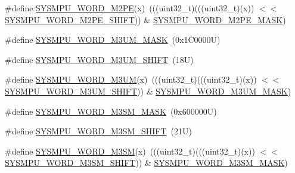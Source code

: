 \begin{DoxyCompactItemize}
\#define \mbox{\hyperlink{group___s_y_s_m_p_u___register___masks_ga04e88db67ef837b1c5916513c6b825cd}{S\+Y\+S\+M\+P\+U\+\_\+\+W\+O\+R\+D\+\_\+\+M2\+PE}}(x)~(((uint32\+\_\+t)(((uint32\+\_\+t)(x)) $<$$<$ \mbox{\hyperlink{group___s_y_s_m_p_u___register___masks_gaa7e65aacdb7fea3b44442a9262ed6232}{S\+Y\+S\+M\+P\+U\+\_\+\+W\+O\+R\+D\+\_\+\+M2\+P\+E\+\_\+\+S\+H\+I\+FT}})) \& \mbox{\hyperlink{group___s_y_s_m_p_u___register___masks_ga7f72b16598726a30a3fcd0f69e5f88f1}{S\+Y\+S\+M\+P\+U\+\_\+\+W\+O\+R\+D\+\_\+\+M2\+P\+E\+\_\+\+M\+A\+SK}})
\item 
\#define \mbox{\hyperlink{group___s_y_s_m_p_u___register___masks_ga9b6b9421f66f545a7ed0c342eb0e5e2e}{S\+Y\+S\+M\+P\+U\+\_\+\+W\+O\+R\+D\+\_\+\+M3\+U\+M\+\_\+\+M\+A\+SK}}~(0x1\+C0000\+U)
\item 
\#define \mbox{\hyperlink{group___s_y_s_m_p_u___register___masks_gadfbd9684345392e532f7fd37bbd5a3f2}{S\+Y\+S\+M\+P\+U\+\_\+\+W\+O\+R\+D\+\_\+\+M3\+U\+M\+\_\+\+S\+H\+I\+FT}}~(18\+U)
\item 
\#define \mbox{\hyperlink{group___s_y_s_m_p_u___register___masks_gab7dcfe7c446a2e44c7e31bed98b34f5f}{S\+Y\+S\+M\+P\+U\+\_\+\+W\+O\+R\+D\+\_\+\+M3\+UM}}(x)~(((uint32\+\_\+t)(((uint32\+\_\+t)(x)) $<$$<$ \mbox{\hyperlink{group___s_y_s_m_p_u___register___masks_gadfbd9684345392e532f7fd37bbd5a3f2}{S\+Y\+S\+M\+P\+U\+\_\+\+W\+O\+R\+D\+\_\+\+M3\+U\+M\+\_\+\+S\+H\+I\+FT}})) \& \mbox{\hyperlink{group___s_y_s_m_p_u___register___masks_ga9b6b9421f66f545a7ed0c342eb0e5e2e}{S\+Y\+S\+M\+P\+U\+\_\+\+W\+O\+R\+D\+\_\+\+M3\+U\+M\+\_\+\+M\+A\+SK}})
\item 
\#define \mbox{\hyperlink{group___s_y_s_m_p_u___register___masks_ga59814d59ef917844397a31d4fc167a55}{S\+Y\+S\+M\+P\+U\+\_\+\+W\+O\+R\+D\+\_\+\+M3\+S\+M\+\_\+\+M\+A\+SK}}~(0x600000\+U)
\item 
\#define \mbox{\hyperlink{group___s_y_s_m_p_u___register___masks_gacbfcc275939bc9c80a3ca862d0de36ab}{S\+Y\+S\+M\+P\+U\+\_\+\+W\+O\+R\+D\+\_\+\+M3\+S\+M\+\_\+\+S\+H\+I\+FT}}~(21\+U)
\item 
\#define \mbox{\hyperlink{group___s_y_s_m_p_u___register___masks_ga1e888ec8d33a10847c6754997793500f}{S\+Y\+S\+M\+P\+U\+\_\+\+W\+O\+R\+D\+\_\+\+M3\+SM}}(x)~(((uint32\+\_\+t)(((uint32\+\_\+t)(x)) $<$$<$ \mbox{\hyperlink{group___s_y_s_m_p_u___register___masks_gacbfcc275939bc9c80a3ca862d0de36ab}{S\+Y\+S\+M\+P\+U\+\_\+\+W\+O\+R\+D\+\_\+\+M3\+S\+M\+\_\+\+S\+H\+I\+FT}})) \& \mbox{\hyperlink{group___s_y_s_m_p_u___register___masks_ga59814d59ef917844397a31d4fc167a55}{S\+Y\+S\+M\+P\+U\+\_\+\+W\+O\+R\+D\+\_\+\+M3\+S\+M\+\_\+\+M\+A\+SK}})
$$
\end{DoxyCompactItemize}
